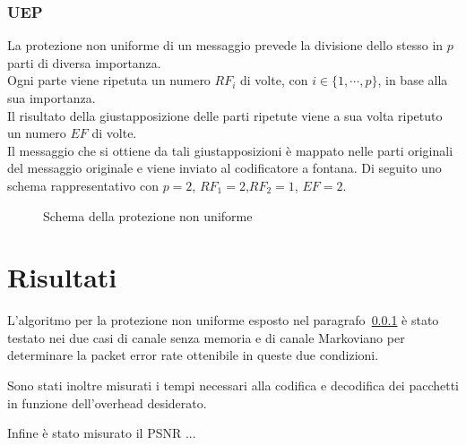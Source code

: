 \documentclass[italian, a4paper, 12pt]{article}
\begin{document}
\subsubsection{UEP}\label{UEPsection}
La protezione non uniforme di un messaggio prevede la divisione dello stesso in $p$ parti di diversa importanza.\\
Ogni parte viene ripetuta un numero $RF_i$ di volte, con $i\in\{1,\cdots,p\}$, in base alla sua importanza.\\
Il risultato della giustapposizione delle parti ripetute viene a sua volta ripetuto un numero $EF$ di volte.\\
Il messaggio che si ottiene da tali giustapposizioni è mappato nelle parti originali del messaggio originale e viene inviato al codificatore a fontana. Di seguito uno schema rappresentativo con $p=2$, $RF_1 = 2$,$RF_2=1$, $EF=2$.
\begin{figure}[H]
    \centering
    \caption{Schema della protezione non uniforme}
    \label{fig:UEP}
\end{figure}
\newpage
\section{Risultati}
L'algoritmo per la protezione non uniforme esposto nel
paragrafo~\ref{UEPsection} è stato testato nei due casi di canale senza
memoria e di canale Markoviano per determinare la packet error rate
ottenibile in queste due condizioni.

Sono stati inoltre misurati i tempi necessari alla codifica e
decodifica dei pacchetti in funzione dell'overhead desiderato.

Infine è stato misurato il PSNR ...
\end{document}
